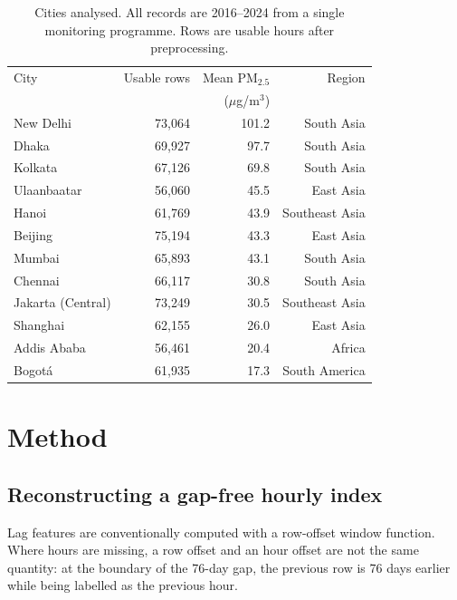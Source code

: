 \documentclass[conference,a4paper]{IEEEtran}
\begin{document}
\begin{table}[t]
\caption{Cities analysed. All records are 2016--2024 from a single monitoring
programme. Rows are usable hours after preprocessing.}
\label{tab:cities}
\centering
\small
\begin{tabular}{@{}lrrr@{}}
\toprule
City & Usable rows & Mean PM$_{2.5}$ & Region \\
     &             & ($\mu$g/m$^3$)  &        \\
\midrule
New Delhi        & 73{,}064 & 101.2 & South Asia \\
Dhaka            & 69{,}927 &  97.7 & South Asia \\
Kolkata          & 67{,}126 &  69.8 & South Asia \\
Ulaanbaatar      & 56{,}060 &  45.5 & East Asia \\
Hanoi            & 61{,}769 &  43.9 & Southeast Asia \\
Beijing          & 75{,}194 &  43.3 & East Asia \\
Mumbai           & 65{,}893 &  43.1 & South Asia \\
Chennai          & 66{,}117 &  30.8 & South Asia \\
Jakarta (Central)& 73{,}249 &  30.5 & Southeast Asia \\
Shanghai         & 62{,}155 &  26.0 & East Asia \\
Addis Ababa      & 56{,}461 &  20.4 & Africa \\
Bogot\'a         & 61{,}935 &  17.3 & South America \\
\bottomrule
\end{tabular}
\end{table}

\section{Method}

\subsection{Reconstructing a gap-free hourly index}
Lag features are conventionally computed with a row-offset window function. Where
hours are missing, a row offset and an hour offset are not the same quantity: at
the boundary of the 76-day gap, the previous row is 76 days earlier while being
labelled as the previous hour.
\end{document}
